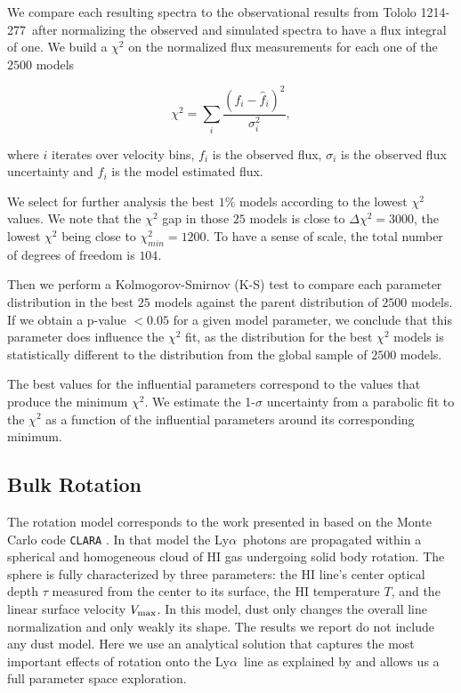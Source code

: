 \documentclass[a4,useAMS,usenatbib,usegraphicx]{mn2e}
\newcommand{\tol}{Tololo 1214-277}
\newcommand{\lya}{Ly$\alpha$}
\begin{document}
We compare each resulting spectra to the observational results from
\tol\ after normalizing the observed and simulated spectra to have a 
flux integral of one.
We build a $\chi^2$ on the normalized flux measurements for each one
of the $2500$ models

\begin{equation}
\chi^2 = \sum_{i} \frac{({f}_i - \hat{f}_i)^2}{\sigma_i^2}, 
\label{eq:chi2}
\end{equation}

where $i$ iterates over velocity bins, $f_{i}$ is the observed flux,
$\sigma_i$ is the observed flux uncertainty and $\hat{f}_i$ is the
model estimated flux.
 
We select for further analysis the best $1\%$ models according to the
lowest $\chi^2$ values.
We note that the $\chi^2$ gap in those $25$ models is close to
$\Delta\chi^2 = 3000$, the lowest $\chi^2$ being close to
$\chi^2_{min}=1200$.
To have a sense of scale, the total number of degrees of freedom is
$104$. 

Then we perform a Kolmogorov-Smirnov (K-S) test to compare each parameter
distribution in the best $25$ models against the parent distribution
of $2500$ models. 
If we obtain a p-value $<0.05$ for a given model parameter, we conclude that
this parameter does influence the $\chi^2$ fit, as the distribution for
the best $\chi^2$ models is statistically different to the
distribution from the global sample of $2500$ models.  

The best values for the influential parameters correspond to
the values that produce the minimum
$\chi^2$.
We estimate the 1-$\sigma$ uncertainty from a parabolic fit to the
$\chi^2$ as a function of the influential parameters around its
corresponding minimum.   



\subsection{Bulk Rotation}

The rotation model corresponds to the work presented in
\citep{GaravitoCamargo2014} based on the Monte Carlo code
\texttt{CLARA} \citep{CLARA}. 
In that model the \lya\ photons are propagated 
within a spherical and homogeneous cloud of HI gas undergoing solid
body rotation.
The sphere is fully characterized by three parameters: the HI line's
center optical  depth $\tau$ measured from the center to its surface, the HI
temperature $T$, and the linear surface velocity $V_{\rm max}$.  
In this model, dust only changes the overall line
normalization and only weakly its shape.  
The results we report do not include any dust model.
Here we use an analytical solution that captures the most important
effects of rotation onto the \lya\ line as explained by
\citet{GaravitoCamargo2014} and allows us a full parameter space
exploration.  
\end{document}

